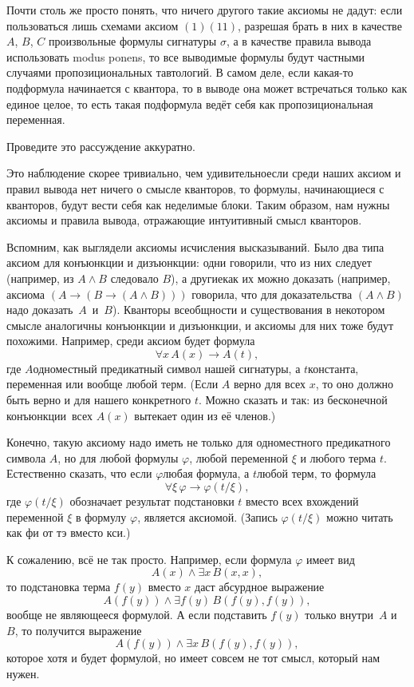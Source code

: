 Почти столь же просто понять, что ничего другого такие аксиомы
не дадут: если пользоваться лишь схемами аксиом $(1)$\ч $(11)$,
разрешая брать в них в качестве $A$, $B$, $C$ произвольные формулы
сигнатуры $\sigma$, а в качестве правила вывода использовать
modus ponens, то все выводимые формулы будут частными случаями
пропозициональных тавтологий. В самом деле, если какая-то подформула
начинается с квантора, то в выводе она может встречаться только
как единое целое, то есть такая подформула ведёт себя как
пропозициональная переменная.

\begin{problem}
Проведите это рассуждение аккуратно.
\end{problem}

Это наблюдение скорее тривиально, чем удивительно\т если среди
наших аксиом и правил вывода нет ничего о смысле кванторов, то
формулы, начинающиеся с кванторов, будут вести себя как
неделимые блоки. Таким образом, нам нужны аксиомы и правила
вывода, отражающие интуитивный смысл кванторов.

Вспомним, как выглядели аксиомы исчисления высказываний. 
Было два типа аксиом для конъюнкции и дизъюнкции: одни говорили,
что из них следует (например, из $A\land B$ следовало $B$), а
другие\т как их можно доказать (например, аксиома
$(A\to(B\to(A\land B)))$ говорила, что для доказательства
$(A\land B)$ надо доказать~$A$~и~$B$). Кванторы всеобщности и
существования в некотором смысле аналогичны конъюнкции и
дизъюнкции, и аксиомы для них тоже будут похожими. Например,
среди аксиом будет формула
        $$
\forall x\, A(x) \to A(t),
        $$
где $A$\т одноместный предикатный символ нашей сигнатуры, а
$t$\т константа, переменная или вообще любой терм. (Если $A$
верно для всех $x$, то оно должно быть верно и для нашего
конкретного $t$. Можно сказать и так: из  бесконечной
конъюнкции\ всех $A(x)$ вытекает один из её членов.)

Конечно, такую аксиому надо иметь не только для одноместного
предикатного символа $A$, но для любой формулы $\varphi$,
любой переменной $\xi$ и любого терма $t$. Естественно сказать,
что если $\varphi$\т любая формула,
а $t$\т любой терм, то формула
        $$
\forall \xi\, \varphi \to \varphi(t/\xi),
        $$
где $\varphi(t/\xi)$ обозначает результат подстановки $t$ вместо
всех вхождений переменной $\xi$ в формулу $\varphi$, является
аксиомой. (Запись $\varphi(t/\xi)$ можно читать как  фи от тэ
вместо кси.)

К сожалению, всё не так просто. Например, если формула $\varphi$
имеет вид
      $$A(x)\land\exists x\, B(x,x),$$
то подстановка терма
$f(y)$ вместо $x$ даст абсурдное выражение
        $$
     A(f(y))\land\exists f(y)\, B(f(y),f(y)),
        $$
вообще не являющееся формулой. А если подставить $f(y)$ только
внутри~$A$ и~$B$, то получится выражение
        $$
     A(f(y))\land\exists x\, B(f(y),f(y)),
        $$
которое хотя и будет формулой, но имеет совсем не тот смысл,
который нам нужен.


